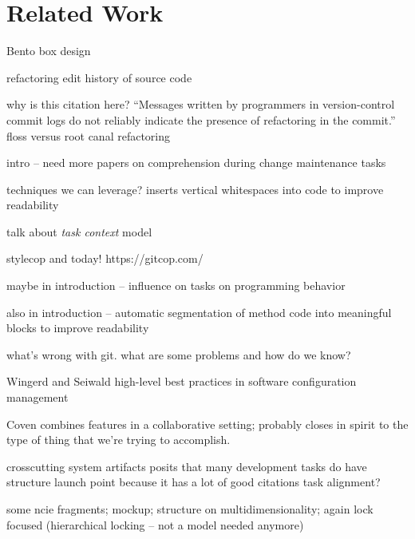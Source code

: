 \documentclass[conference]{IEEEtran}
\begin{document}



\section{Related Work}

Bento box design~\cite{DeLine2010a}

refactoring edit history of source code~\cite{Hayashi2012}

why is this citation here? ``Messages written by programmers in version-control commit logs do not reliably indicate the presence of refactoring in the commit.''
floss versus root canal refactoring~\cite{Murphy-Hill2012c}

intro -- need more papers on comprehension during change maintenance tasks

techniques we can leverage?
inserts vertical whitespaces into code to improve readability~\cite{Wang2011}


talk about \emph{task context} model

stylecop
and today! https://gitcop.com/


maybe in introduction -- influence on tasks on programming behavior~\cite{Ying2011a}

also in introduction -- automatic segmentation of method code into
meaningful blocks to improve readability 

what's wrong with git. what are some problems and how do we know?~\cite{PerezDeRosso2013}

Wingerd and Seiwald
high-level best practices in software configuration management~\cite{Wingerd1998}

Coven combines features in a collaborative setting; probably closes in spirit to the type of thing that we're trying to accomplish.~\cite{Chu-Carroll2000}

crosscutting system artifacts
posits that many development tasks do have structure
launch point because it has a lot of good citations
task alignment?~\cite{Murphy2005}

some ncie fragments; mockup; structure on multidimensionality; again lock focused (hierarchical locking -- not a model needed anymore)
~\cite{Chu-Carroll2003}
\end{document}

